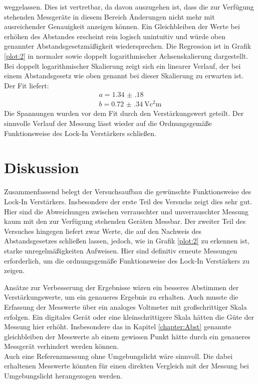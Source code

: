 weggelassen. Dies ist vertretbar, da davon auszugehen ist, dass die zur Verfügung stehenden Messgeräte in diesem Bereich Änderungen nicht
mehr mit ausreichender Genauigkeit anzeigen können. Ein Gleichbleiben der Werte bei erhöhen des Abstandes
erscheint rein logisch unintuitiv und würde oben genannter Abstandsgesetzmäßigkeit wiedersprechen. Die Regression ist
in Grafik \ref{plot:2} in normaler sowie doppelt logarithmischer Achsenskalierung dargestellt.
Bei doppelt logarithmischer Skalierung zeigt sich ein linearer Verlauf, der bei einem Abstandsgesetz wie oben genannt
bei dieser Skalierung zu erwarten ist. Der Fit liefert:
\begin{equation*}
  \begin{split}
    a = \num{1.34(18)}\\
    b = \SI{0.72(34)}{\volt\square\centi\metre}
  \end{split}
\end{equation*}
Die Spannungen wurden vor dem Fit durch den Verstärkungswert geteilt. Der sinnvolle Verlauf der Messung
lässt wieder auf die Ordnungsgemäße Funktionsweise des Lock-In Verstärkers schließen.
\section{Diskussion}
Zusammenfassend belegt der Versuchsaufbau die gewünschte Funktionsweise des Lock-In Verstärkers. Insbesondere der erste Teil
des Versuchs zeigt dies sehr gut. Hier sind die Abweichungen zwischen verrauschter und unverrauschter Messung kaum mit
den zur Verfügung stehenden Geräten Messbar. Der zweiter Teil des Versuches hingegen liefert zwar
Werte, die auf den Nachweis des Abstandsgesetzes schließen lassen, jedoch, wie in Grafik \ref{plot:2} zu erkennen ist,
starke unregelmäßigkeiten Aufweisen. Hier sind definitiv erneute Messungen erforderlich, um
die ordnungsgemäße Funktionsweise des Lock-In Verstärkers zu zeigen.

Ansätze zur Verbesserung der Ergebnisse wären ein besseres Abstimmen der Verstärkungswerte, um ein
genaueres Ergebnis zu erhalten. Auch musste die Erfassung der Messwerte über ein analoges
Voltmeter mit großschrittiger Skala erfolgen. Ein digitales Gerät oder eine kleinschrittigere
Skala hätten die Güte der Messung hier erhöht. Insbesondere das in Kapitel \ref{chapter:Abst}
genannte gleichbleiben der Messwerte ab einem gewissen Punkt hätte durch ein genaueres
Messgerät verhindert werden können.\\
Auch eine Referenzmessung ohne Umgebungslicht wäre sinnvoll. Die dabei erhaltenen
Messwerte könnten für einen direkten Vergleich mit der Messung bei Umgebungslicht herangezogen werden.

\newpage
\nocite{*}
\printbibliography
